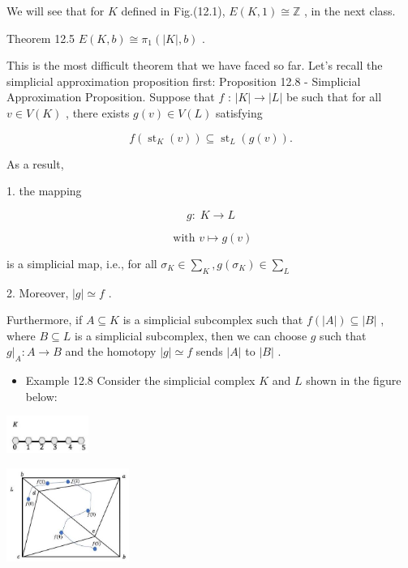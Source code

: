 We will see that for \(K\) defined in Fig.(12.1), \(E\left( {K,1}\right)  \cong  \mathbb{Z}\) , in the next class.

Theorem 12.5 \(E\left( {K,b}\right)  \cong  {\pi }_{1}\left( {\left| K\right| ,b}\right)\) .

This is the most difficult theorem that we have faced so far. Let's recall the simplicial approximation proposition first: Proposition 12.8 - Simplicial Approximation Proposition. Suppose that \(f\) : \(\left| K\right|  \rightarrow  \left| L\right|\) be such that for all \(v \in  V\left( K\right)\) , there exists \(g\left( v\right)  \in  V\left( L\right)\) satisfying

\[
f\left( {{\operatorname{st}}_{K}\left( v\right) }\right)  \subseteq  {\operatorname{st}}_{L}\left( {g\left( v\right) }\right) .
\]

As a result,

1. the mapping

\[
g : \;K \rightarrow  L
\]

\[
\text{ with }v \mapsto  g\left( v\right)
\]

is a simplicial map, i.e., for all \({\sigma }_{K} \in  {\sum }_{K},g\left( {\sigma }_{K}\right)  \in  {\sum }_{L}\)

2. Moreover, \(\left| g\right|  \simeq  f\) .

Furthermore, if \(A \subseteq  K\) is a simplicial subcomplex such that \(f\left( \left| A\right| \right)  \subseteq  \left| B\right|\) , where \(B \subseteq  L\) is a simplicial subcomplex, then we can choose \(g\) such that \({\left. g\right| }_{A} : A \rightarrow  B\) and the homotopy \(\left| g\right|  \simeq  f\) sends \(\left| A\right|\) to \(\left| B\right|\) .

\begin{itemize}
\item Example 12.8 Consider the simplicial complex \(K\) and \(L\) shown in the figure below:
\end{itemize}

\begin{center}
\includegraphics[max width=0.2\textwidth]{images/bo_d2bcsrref24c73avs720_128_422_1463_225_103_0.jpg}
\end{center}
\hspace*{3em} 

\begin{center}
\includegraphics[max width=0.3\textwidth]{images/bo_d2bcsrref24c73avs720_128_830_1421_425_323_0.jpg}
\end{center}
\hspace*{3em} 

